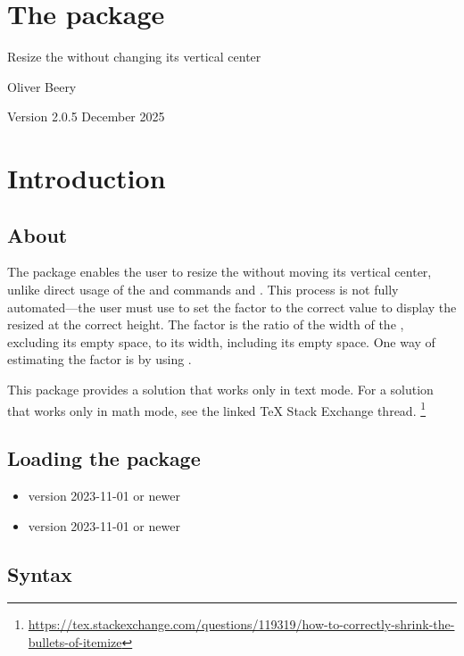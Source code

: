 \documentclass{beerydoc}
\begin{document}
\section*{\Large The  package}

Resize the  without changing its vertical center

Oliver Beery

Version 2.0.5 December 2025


\section{Introduction}
\label{sec:intro}

\subsection{About}
\label{subsec:about}

The  package enables the user to resize the
 without moving its vertical center, unlike direct usage of the
\LaTeXe{} and  commands  and .
This process is not fully automated---the user must use
 to set the  factor to the correct
value to display the resized  at the correct height.
The  factor is the ratio of the width of the ,
excluding its empty space, to its width, including its empty space.
One way of estimating the  factor is by using
.

This package provides a solution that works only in text mode.
For a solution that works only in math mode, see the linked \TeX{} Stack
Exchange thread.%
\footnote{\url{https://tex.stackexchange.com/questions/119319/how-to-correctly-shrink-the-bullets-of-itemize}}

\subsection{Loading the package}
\label{subsec:loading}

\begin{itemize}
  \item \LaTeXe{} version 2023-11-01 or newer
  \item {} version 2023-11-01 or newer
\end{itemize}

\subsection{Syntax}
\label{subsec:syntax}
\end{document}
